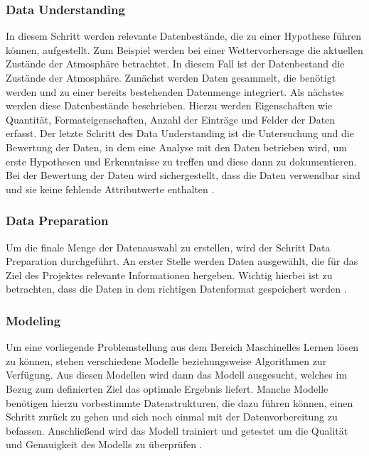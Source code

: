 \documentclass[12pt]{scrreprt}
\begin{document}
\subsubsection{Data Understanding}
	
In diesem Schritt werden relevante Datenbestände, die zu einer Hypothese führen können, aufgestellt. Zum Beispiel werden bei einer Wettervorhersage die aktuellen Zustände der Atmosphäre betrachtet. In diesem Fall ist der Datenbestand die Zustände der Atmosphäre. Zunächst werden Daten gesammelt, die benötigt werden und zu einer bereits bestehenden Datenmenge integriert. Als nächstes werden diese Datenbestände beschrieben. Hierzu werden Eigenschaften wie Quantität, Formateigenschaften, Anzahl der Einträge und Felder der Daten erfasst. Der letzte Schritt des Data Understanding ist die Untersuchung und die Bewertung der Daten, in dem eine Analyse mit den Daten betrieben wird, um erste Hypothesen und Erkenntnisse zu treffen und diese dann zu dokumentieren. Bei der Bewertung der Daten wird sichergestellt, dass die Daten verwendbar sind und sie keine fehlende Attributwerte enthalten \cite{Wuttke}.
	
\subsubsection{Data Preparation}
	
Um die finale Menge der Datenauswahl zu erstellen, wird der Schritt Data Preparation durchgeführt. An erster Stelle werden Daten ausgewählt, die für das Ziel des Projektes relevante Informationen hergeben. Wichtig hierbei ist zu betrachten, dass die Daten in dem richtigen Datenformat gespeichert werden \cite{Wuttke}.
	
\subsubsection{Modeling}
	
Um eine vorliegende Problemstellung aus dem Bereich Maschinelles Lernen lösen zu können, stehen verschiedene Modelle beziehungsweise Algorithmen zur Verfügung. Aus diesen Modellen wird dann das Modell ausgesucht, welches im Bezug zum definierten Ziel das optimale Ergebnis liefert. Manche Modelle benötigen hierzu vorbestimmte Datenstrukturen, die dazu führen können, einen Schritt zurück zu gehen und sich noch einmal mit der Datenvorbereitung zu befassen. Anschließend wird das Modell trainiert und getestet um die Qualität und Genauigkeit des Modells zu überprüfen \cite{Wuttke}.
	
\end{document}
